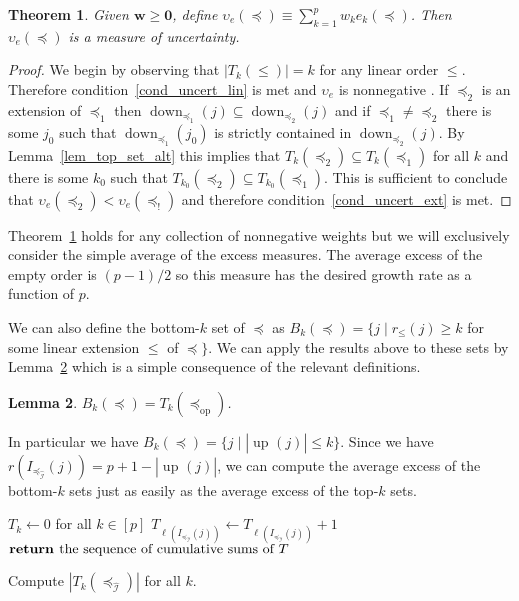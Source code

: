 \documentclass[12pt]{article}
\newcommand{\return}[1]{\textbf{return }#1}
\newcommand{\dual}[1]{#1_{\operatorname{op}}}
\newcommand{\dset}[2][]{\operatorname{down}_{#1}(#2)}
\newcommand{\uset}[2][]{\operatorname{up}_{#1}(#2)}
\newcommand{\iord}{{\preceq_{\hat{\mathcal{I}}}}}
\newtheorem{theorem}{Theorem}
\numberwithin{theorem}{section}
\newtheorem{lemma}[theorem]{Lemma}
\begin{document}
\begin{theorem}
\label{thm_excess_uncert_measure}
Given $\mathbf{w} \geq \mathbf{0}$, define $\upsilon_e(\preceq) \equiv \sum_{k = 1}^p w_k e_k(\preceq)$.  Then $\upsilon_e(\preceq)$ is a measure of uncertainty.
\end{theorem}
\begin{proof}
We begin by observing that $|T_k(\leqslant)| = k$ for any linear order $\leqslant$.  Therefore condition~\ref{cond_uncert_lin} is met and $\upsilon_e$ is nonnegative .  If $\preceq_2$ is an extension of $\preceq_1$ then $\dset[\preceq_1]{j} \subseteq \dset[\preceq_2]{j}$ and if $\preceq_1 \neq \preceq_2$ there is some $j_0$ such that $\dset[\preceq_1]{j_0}$ is strictly contained in $\dset[\preceq_2]{j}$.  By Lemma~\ref{lem_top_set_alt} this implies that $T_k(\preceq_2) \subseteq T_k(\preceq_1)$ for all $k$ and there is some $k_0$ such that $T_{k_0}(\preceq_2) \subseteq T_{k_0}(\preceq_1)$.  This is sufficient to conclude that $\upsilon_e(\preceq_2) < \upsilon_e(\preceq_!)$ and therefore condition~\ref{cond_uncert_ext} is met.
\end{proof}

Theorem~\ref{thm_excess_uncert_measure} holds for any collection of nonnegative weights but we will exclusively consider the simple average of the excess measures.  The average excess of the empty order is $(p - 1) / 2$ so this measure has the desired growth rate as a function of $p$.

We can also define the bottom-$k$ set of $\preceq$ as $B_k(\preceq) = \{j \mid r_\leqslant(j) \geq k$ for some linear extension $\leqslant$ of $\preceq\}$.  We can apply the results above to these sets by Lemma~\ref{lem_bottom_set} which is a simple consequence of the relevant definitions.

\begin{lemma}
\label{lem_bottom_set}
$B_k(\preceq) = T_k(\dual{\preceq})$.
\end{lemma}

In particular we have $B_k(\preceq) = \{j \mid |\uset{j}| \leq k\}$.  Since we have $r(I_\iord(j)) = p + 1 - |\uset{j}|$, we can compute the average excess of the bottom-$k$ sets just as easily as the average excess of the top-$k$ sets.

\begin{algorithm}[t]
\begin{algorithmic}
\Procedure{ComputeExcess}{$I_\iord(i), \dots, I_\iord(p)$}
  \State $T_k \gets 0$ for all $k \in [p]$
    \State $T_{\ell\left(I_\iord(j)\right)} \gets T_{\ell\left(I_\iord(j)\right)} + 1$
  \EndFor
  \State $\return{\text{the sequence of cumulative sums of \ensuremath{T}}}$
\EndProcedure
\end{algorithmic}
\caption{Compute $|T_k(\iord)|$ for all $k$.}
\label{algo_excess}
\end{algorithm}
\end{document}
